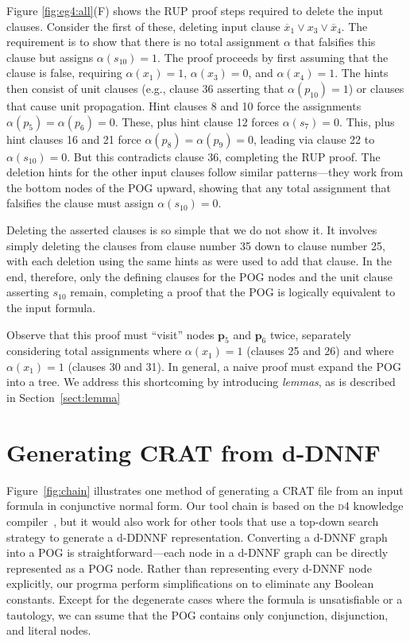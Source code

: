 \documentclass[letterpaper,USenglish,cleveref, autoref, thm-restate]{lipics-v2021}
\newcommand{\obar}[1]{\overline{#1}}
\newcommand{\assign}{\alpha}
\newcommand{\makenode}[1]{\mathbf{#1}}
\newcommand{\nodep}{\makenode{p}}
\newcommand{\progname}[1]{\textsc{#1}}
\newcommand{\dfour}{\progname{d4}}
\begin{document}
Figure \ref{fig:eg4:all}(F) shows the RUP proof steps required to
delete the input clauses.  Consider the first of these, deleting
input clause $\obar{x}_1 \lor x_3 \lor \obar{x}_4$.  The requirement is to show
that there is no total assignment $\assign$ that falsifies this clause but assigns $\assign(s_{10}) = 1$.
The proof proceeds by first assuming that the clause is false, requiring
$\assign(x_1) = 1$, $\assign(x_3) = 0$, and $\assign(x_4) = 1$.  The hints then consist of unit
clauses (e.g., clause 36 asserting that $\alpha(p_{10}) = 1$) or
clauses that cause unit propagation.  Hint clauses 8 and 10 force the
assignments $\assign(p_5) = \assign(p_6) = 0$.  These, plus hint clause 12 forces
$\assign(s_7) = 0$.  This, plus hint clauses 16 and 21 force $\assign(p_8) = \assign(p_9) = 0$, leading
via clause 22 to $\assign(s_{10}) = 0$.  But this contradicts clause 36,
completing the RUP proof.  The deletion hints for the other input
clauses follow similar patterns---they work from the bottom nodes of
the POG upward, showing that any total assignment that falsifies the clause
must assign $\assign(s_{10}) = 0$.

Deleting the asserted clauses is so simple that we do not show it.  It
involves simply deleting the clauses from clause number 35 down to
clause number 25, with each deletion using the same hints as were used
to add that clause.  In the end, therefore, only the defining clauses
for the POG nodes and the unit clause asserting $s_{10}$ remain,
completing a proof that the POG is logically equivalent to the input
formula.

Observe that this proof must ``visit'' nodes
$\nodep_5$ and $\nodep_6$ twice, separately considering total assignments where $\assign(x_1) = 1$
(clauses 25 and 26) and where $\assign(x_1) = 1$ (clauses 30 and 31).  In
general, a naive proof must expand the POG into a tree.
We address this shortcoming by introducing {\em lemmas}, as is described in Section~\ref{sect:lemma}


\section{Generating CRAT from d-DNNF}

Figure~\ref{fig:chain} illustrates one method of generating a CRAT
file from an input formula in conjunctive normal form.  Our tool chain
is based on the \dfour{} knowledge compiler~\cite{lagniez:ijcai:2017},
but it would also work for other tools that use a top-down search
strategy to generate a d-DDNNF representation.  Converting a d-DNNF
graph into a POG is straightforward---each node in a d-DNNF graph can
be directly represented as a POG node.  Rather than representing every d-DNNF node explicitly,
our progrma perform simplifications on
to eliminate any Boolean constants.  Except for the degenerate cases where the formula is unsatisfiable or a tautology, we can
ssume that the POG contains only conjunction, disjunction,
and literal nodes.
\end{document}
